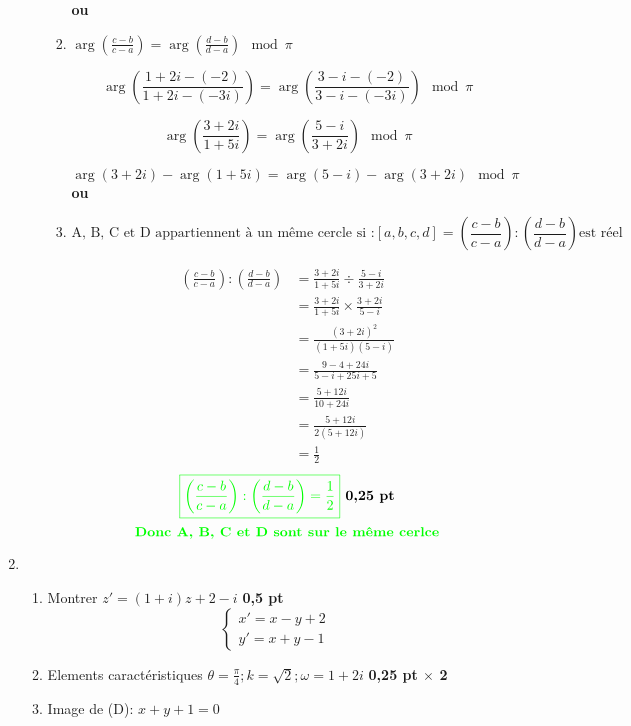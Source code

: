 \documentclass[12pt]{article}
\begin{document}
\begin{enumerate}
\begin{enumerate}
\begin{enumerate}
\textbf{ou}
\item 
$\arg \left({\frac {c-b}{c-a}}\right)=\arg \left({\frac {d-b}{d-a}}\right)\mod \pi $

\[
\arg \left({\frac {1+2i-(-2)}{1+2i-(-3i)}}\right)=\arg \left({\frac {3-i-(-2)}{3-i-(-3i)}}\right)\mod \pi
\]

\[
\arg \left({\frac {3+2i}{1+5i}}\right)=\arg \left({\frac {5-i}{3+2i}}\right)\mod \pi
\]

\[
\arg \left(3+2i\right)-\arg\left(1+5i\right)=\arg \left(5-i\right)-\arg\left(3+2i\right)\mod \pi
\]
\textbf{ou}
\item 
\[
\text{A, B, C et D appartiennent à un même cercle si :}\left[ a,b,c,d \right] =\left({\frac {c-b}{c-a}}\right):\left({\frac {d-b}{d-a}}\right) \text{est réel}
\]

\begin{align*}
\left({\frac {c-b}{c-a}}\right):\left({\frac {d-b}{d-a}}\right)&=\frac {3+2i}{1+5i} \div \frac {5-i}{3+2i}\\
																&=\frac {3+2i}{1+5i}\times \frac {3+2i}{5-i}\\																		&=\frac {(3+2i)^{2}}{(1+5i)(5-i)}\\
																&=\frac {9-4+24i}{5-i+25i+5}\\
																&=\frac {5+12i}{10+24i}\\
																&=\frac {5+12i}{2(5+12i)}\\
																&=\frac {1}{2}
\end{align*}
\[
\textcolor{green}{\boxed{\left({\frac {c-b}{c-a}}\right):\left({\frac {d-b}{d-a}}\right)=\frac {1}{2}}}\textbf{ 0,25 pt}
\]
\[
\textcolor{green}{\textbf{Donc A, B, C et D sont sur le même cerlce}}
\]

\end{enumerate}

\end{enumerate}
\item 
\begin{enumerate}
\item Montrer $z'=(1+i)z+2-i$ \textbf{ 0,5 pt}
\[\begin{cases}
x'=x-y+2\\
y'=x+y-1
\end{cases}\]
\item Elements caractéristiques
$\theta=\frac{\pi}{4}; k=\sqrt{2}; \omega=1+2i$ \textbf{ 0,25 pt $\times$ 2}
\item Image de (D): $x+y+1=0$


\end{enumerate}
\end{enumerate}
\end{document}
